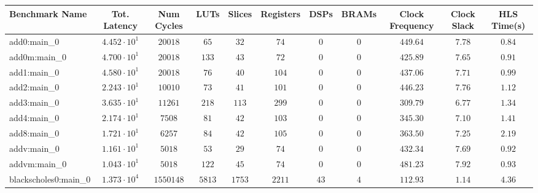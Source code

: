 \begin{tabular}{|l|c|c|c|c|c|c|c|c|c|c|}
\hline
Benchmark Name                 & Tot. Latency           & Num Cycles   & LUTs       & Slices     & Registers  & DSPs     & BRAMs    & Clock Frequency & Clock Slack & HLS Time(s) \\
\hline
add0:main\_0                   & $ 4.452 \cdot 10^{1} $ & $ 20018    $ & $ 65     $ & $ 32     $ & $ 74     $ & $ 0    $ & $ 0    $ & $ 449.64      $ & $ 7.78    $ & $ 0.84    $ \\
add0m:main\_0                  & $ 4.700 \cdot 10^{1} $ & $ 20018    $ & $ 133    $ & $ 43     $ & $ 72     $ & $ 0    $ & $ 0    $ & $ 425.89      $ & $ 7.65    $ & $ 0.91    $ \\
add1:main\_0                   & $ 4.580 \cdot 10^{1} $ & $ 20018    $ & $ 76     $ & $ 40     $ & $ 104    $ & $ 0    $ & $ 0    $ & $ 437.06      $ & $ 7.71    $ & $ 0.99    $ \\
add2:main\_0                   & $ 2.243 \cdot 10^{1} $ & $ 10010    $ & $ 73     $ & $ 41     $ & $ 101    $ & $ 0    $ & $ 0    $ & $ 446.23      $ & $ 7.76    $ & $ 1.12    $ \\
add3:main\_0                   & $ 3.635 \cdot 10^{1} $ & $ 11261    $ & $ 218    $ & $ 113    $ & $ 299    $ & $ 0    $ & $ 0    $ & $ 309.79      $ & $ 6.77    $ & $ 1.34    $ \\
add4:main\_0                   & $ 2.174 \cdot 10^{1} $ & $ 7508     $ & $ 81     $ & $ 42     $ & $ 103    $ & $ 0    $ & $ 0    $ & $ 345.30      $ & $ 7.10    $ & $ 1.41    $ \\
add8:main\_0                   & $ 1.721 \cdot 10^{1} $ & $ 6257     $ & $ 84     $ & $ 42     $ & $ 105    $ & $ 0    $ & $ 0    $ & $ 363.50      $ & $ 7.25    $ & $ 2.19    $ \\
addv:main\_0                   & $ 1.161 \cdot 10^{1} $ & $ 5018     $ & $ 53     $ & $ 29     $ & $ 74     $ & $ 0    $ & $ 0    $ & $ 432.34      $ & $ 7.69    $ & $ 0.92    $ \\
addvm:main\_0                  & $ 1.043 \cdot 10^{1} $ & $ 5018     $ & $ 122    $ & $ 45     $ & $ 74     $ & $ 0    $ & $ 0    $ & $ 481.23      $ & $ 7.92    $ & $ 0.93    $ \\
blackscholes0:main\_0          & $ 1.373 \cdot 10^{4} $ & $ 1550148  $ & $ 5813   $ & $ 1753   $ & $ 2211   $ & $ 43   $ & $ 4    $ & $ 112.93      $ & $ 1.14    $ & $ 4.36    $ \\

\end{tabular}
